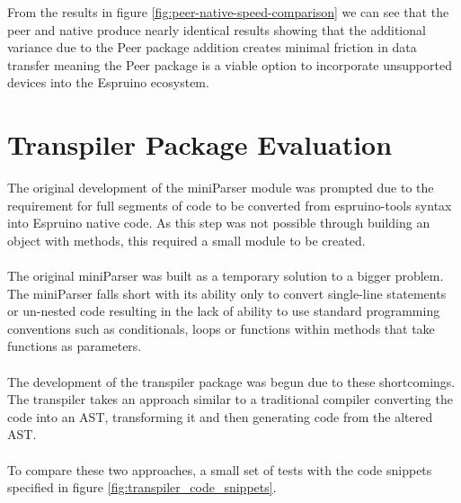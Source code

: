 \documentclass{l4proj}
\begin{document}
From the results in figure \ref{fig:peer-native-speed-comparison} we can see that the peer and native produce nearly identical results showing that the additional variance due to the Peer package addition creates minimal friction in data transfer meaning the Peer package is a viable option to incorporate unsupported devices into the Espruino ecosystem.

\section{Transpiler Package Evaluation}

The original development of the miniParser module was prompted due to the requirement for full segments of code to be converted from espruino-tools syntax into Espruino native code. As this step was not possible through building an object with methods, this required a small module to be created.
\\ \\
The original miniParser was built as a temporary solution to a bigger problem. The miniParser falls short with its ability only to convert single-line statements or un-nested code resulting in the lack of ability to use standard programming conventions such as conditionals, loops or functions within methods that take functions as parameters. 
\\ \\ 
The development of the transpiler package was begun due to these shortcomings. The transpiler takes an approach similar to a traditional compiler converting the code into an AST, transforming it and then generating code from the altered AST.
\\ \\ 
To compare these two approaches, a small set of tests with the code snippets specified in figure \ref{fig:transpiler_code_snippets}.
\end{document}
